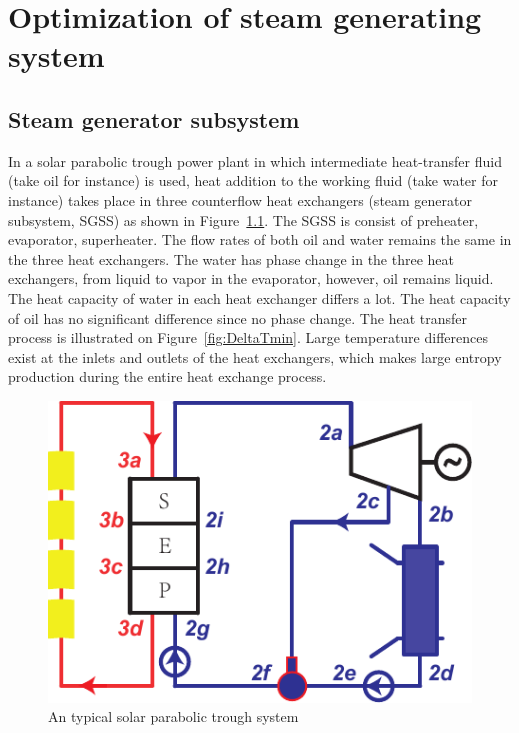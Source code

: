 \chapter{Optimization of steam generating system}
\section{Steam generator subsystem}

In a solar parabolic trough power plant in which intermediate heat-transfer fluid (take oil for instance) is used, heat addition to the working fluid (take water for instance) takes place in three counterflow heat exchangers (steam generator subsystem, SGSS) as shown in Figure~\ref{fig:PTC}. The SGSS is consist of preheater, evaporator, superheater. The flow rates of both oil and water remains the same in the three heat exchangers. 
The water has phase change in the three heat exchangers, from liquid to vapor in the evaporator, however, oil remains liquid. The heat capacity of water in each heat exchanger differs a lot. The heat capacity of oil has no significant difference since no phase change. The heat transfer process is illustrated on Figure~\ref{fig:DeltaTmin}. Large temperature differences exist at the inlets and outlets of the heat exchangers, which makes large entropy production during the entire heat exchange process.


\noindent \begin{figure}[htbp]
\begin{center}
	\includegraphics[width = 0.7\columnwidth]{fig/PTC}
	\caption{An typical solar parabolic trough system}
	\label{fig:PTC}
\end{center}
\end{figure}

